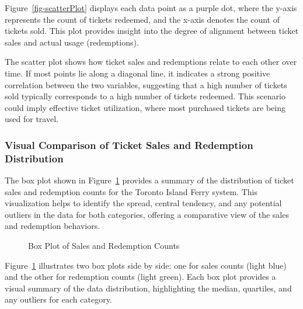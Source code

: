 \documentclass[
  letterpaper,
  DIV=11,
  numbers=noendperiod]{scrartcl}
\begin{document}
Figure~\ref{fig-scatterPlot} displays each data point as a purple dot,
where the y-axis represents the count of tickets redeemed, and the
x-axis denotes the count of tickets sold. This plot provides insight
into the degree of alignment between ticket sales and actual usage
(redemptions).

The scatter plot shows how ticket sales and redemptions relate to each
other over time. If most points lie along a diagonal line, it indicates
a strong positive correlation between the two variables, suggesting that
a high number of tickets sold typically corresponds to a high number of
tickets redeemed. This scenario could imply effective ticket
utilization, where most purchased tickets are being used for travel.

\subsubsection{Visual Comparison of Ticket Sales and Redemption
Distribution}\label{visual-comparison-of-ticket-sales-and-redemption-distribution}

The box plot shown in Figure~\ref{fig-boxPlot} provides a summary of the
distribution of ticket sales and redemption counts for the Toronto
Island Ferry system. This visualization helps to identify the spread,
central tendency, and any potential outliers in the data for both
categories, offering a comparative view of the sales and redemption
behaviors.

\begin{figure}


\caption{\label{fig-boxPlot}Box Plot of Sales and Redemption Counts}

\end{figure}%

Figure~\ref{fig-boxPlot} illustrates two box plots side by side: one for
sales counts (light blue) and the other for redemption counts (light
green). Each box plot provides a visual summary of the data
distribution, highlighting the median, quartiles, and any outliers for
each category.
\end{document}
